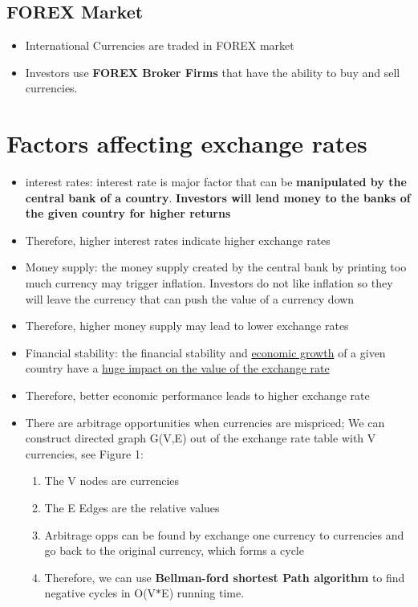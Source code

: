 \documentclass{article}
\begin{document}
\subsection{FOREX Market}
\begin{itemize}
\item International Currencies are traded in FOREX market
\item Investors use \textbf{FOREX Broker Firms} that have the ability to buy and sell currencies.
\end{itemize}

\section{Factors affecting exchange rates}
\begin{itemize}
\item interest rates: interest rate is major factor that can be \textbf{manipulated by the central bank of a country}. \textbf{Investors will lend money to the banks of the given country for higher returns}
\item Therefore, higher interest rates indicate higher exchange rates

\item Money supply: the money supply created by the central bank by printing too much currency may trigger inflation. Investors do not like inflation so they will leave the currency that can push the value of  a currency down
\item Therefore, higher money supply may lead to lower exchange rates

\item Financial stability: the financial stability and \underline{economic growth} of a given country have a \underline{huge impact on the value of the exchange rate}
\item Therefore, better economic performance leads to higher exchange rate
\item There are arbitrage opportunities when currencies are mispriced; We can construct directed graph G(V,E) out of the exchange rate table with V currencies, see Figure 1:

\begin{enumerate}
\item The V nodes are currencies
\item The E Edges are the relative values
\item Arbitrage opps can be found by exchange one currency to currencies and go back to the original currency, which forms a cycle
\item Therefore, we can use \textbf{Bellman-ford shortest Path algorithm} to find negative cycles in O(V$*$E) running time.
\end{enumerate}

\end{itemize}
\end{document}
